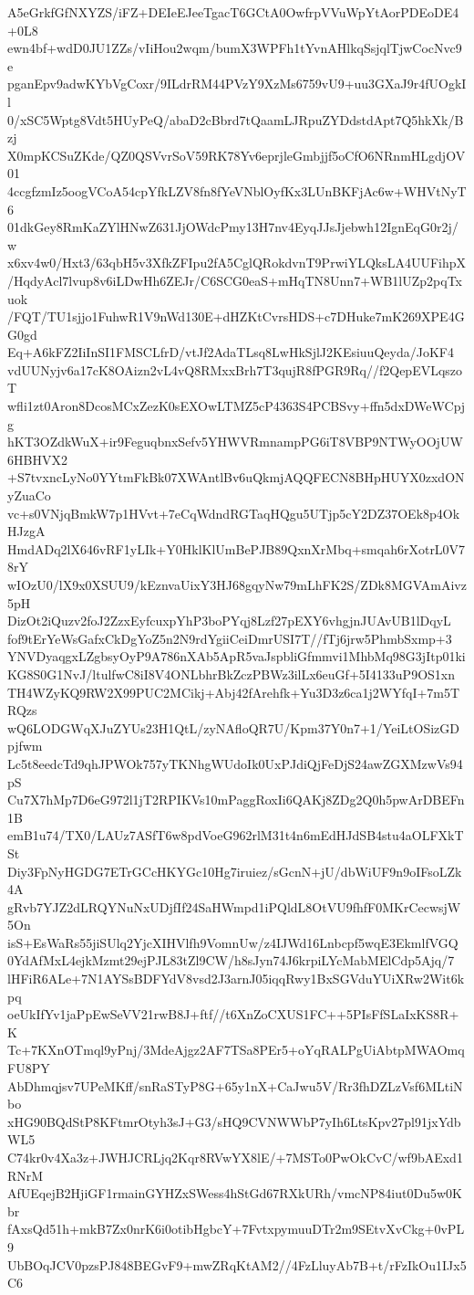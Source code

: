 A5eGrkfGfNXYZS/iFZ+DEIeEJeeTgacT6GCtA0OwfrpVVuWpYtAorPDEoDE4+0L8
ewn4bf+wdD0JU1ZZs/vIiHou2wqm/bumX3WPFh1tYvnAHlkqSsjqlTjwCocNvc9e
pganEpv9adwKYbVgCoxr/9ILdrRM44PVzY9XzMs6759vU9+uu3GXaJ9r4fUOgkIl
0/xSC5Wptg8Vdt5HUyPeQ/abaD2cBbrd7tQaamLJRpuZYDdstdApt7Q5hkXk/Bzj
X0mpKCSuZKde/QZ0QSVvrSoV59RK78Yv6eprjleGmbjjf5oCfO6NRnmHLgdjOV01
4ccgfzmIz5oogVCoA54cpYfkLZV8fn8fYeVNblOyfKx3LUnBKFjAc6w+WHVtNyT6
01dkGey8RmKaZYlHNwZ631JjOWdcPmy13H7nv4EyqJJsJjebwh12IgnEqG0r2j/w
x6xv4w0/Hxt3/63qbH5v3XfkZFIpu2fA5CglQRokdvnT9PrwiYLQksLA4UUFihpX
/HqdyAcl7lvup8v6iLDwHh6ZEJr/C6SCG0eaS+mHqTN8Unn7+WB1lUZp2pqTxuok
/FQT/TU1sjjo1FuhwR1V9nWd130E+dHZKtCvrsHDS+c7DHuke7mK269XPE4GG0gd
Eq+A6kFZ2IiInSI1FMSCLfrD/vtJf2AdaTLsq8LwHkSjlJ2KEsiuuQeyda/JoKF4
vdUUNyjv6a17cK8OAizn2vL4vQ8RMxxBrh7T3qujR8fPGR9Rq//f2QepEVLqszoT
wfli1zt0Aron8DcosMCxZezK0sEXOwLTMZ5cP4363S4PCBSvy+ffn5dxDWeWCpjg
hKT3OZdkWuX+ir9FeguqbnxSefv5YHWVRmnampPG6iT8VBP9NTWyOOjUW6HBHVX2
+S7tvxncLyNo0YYtmFkBk07XWAntlBv6uQkmjAQQFECN8BHpHUYX0zxdONyZuaCo
vc+s0VNjqBmkW7p1HVvt+7eCqWdndRGTaqHQgu5UTjp5cY2DZ37OEk8p4OkHJzgA
HmdADq2lX646vRF1yLIk+Y0HklKlUmBePJB89QxnXrMbq+smqah6rXotrL0V78rY
wIOzU0/lX9x0XSUU9/kEznvaUixY3HJ68gqyNw79mLhFK2S/ZDk8MGVAmAivz5pH
DizOt2iQuzv2foJ2ZzxEyfcuxpYhP3boPYqj8Lzf27pEXY6vhgjnJUAvUB1lDqyL
fof9tErYeWsGafxCkDgYoZ5n2N9rdYgiiCeiDmrUSI7T//fTj6jrw5PhmbSxmp+3
YNVDyaqgxLZgbsyOyP9A786nXAb5ApR5vaJspbliGfmmvi1MhbMq98G3jItp01ki
KG8S0G1NvJ/ltulfwC8iI8V4ONLbhrBkZczPBWz3ilLx6euGf+5I4133uP9OS1xn
TH4WZyKQ9RW2X99PUC2MCikj+Abj42fArehfk+Yu3D3z6ca1j2WYfqI+7m5TRQzs
wQ6LODGWqXJuZYUs23H1QtL/zyNAfloQR7U/Kpm37Y0n7+1/YeiLtOSizGDpjfwm
Lc5t8eedcTd9qhJPWOk757yTKNhgWUdoIk0UxPJdiQjFeDjS24awZGXMzwVs94pS
Cu7X7hMp7D6eG972l1jT2RPIKVs10mPaggRoxIi6QAKj8ZDg2Q0h5pwArDBEFn1B
emB1u74/TX0/LAUz7ASfT6w8pdVoeG962rlM31t4n6mEdHJdSB4stu4aOLFXkTSt
Diy3FpNyHGDG7ETrGCcHKYGc10Hg7iruiez/sGcnN+jU/dbWiUF9n9oIFsoLZk4A
gRvb7YJZ2dLRQYNuNxUDjfIf24SaHWmpd1iPQldL8OtVU9fhfF0MKrCecwsjW5On
isS+EsWaRs55jiSUlq2YjcXIHVlfh9VomnUw/z4IJWd16Lnbcpf5wqE3EkmlfVGQ
0YdAfMxL4ejkMzmt29ejPJL83tZl9CW/h8sJyn74J6krpiLYcMabMElCdp5Ajq/7
lHFiR6ALe+7N1AYSsBDFYdV8vsd2J3arnJ05iqqRwy1BxSGVduYUiXRw2Wit6kpq
oeUkIfYv1jaPpEwSeVV21rwB8J+ftf//t6XnZoCXUS1FC++5PIsFfSLaIxKS8R+K
Tc+7KXnOTmql9yPnj/3MdeAjgz2AF7TSa8PEr5+oYqRALPgUiAbtpMWAOmqFU8PY
AbDhmqjsv7UPeMKff/snRaSTyP8G+65y1nX+CaJwu5V/Rr3fhDZLzVsf6MLtiNbo
xHG90BQdStP8KFtmrOtyh3sJ+G3/sHQ9CVNWWbP7yIh6LtsKpv27pl91jxYdbWL5
C74kr0v4Xa3z+JWHJCRLjq2Kqr8RVwYX8lE/+7MSTo0PwOkCvC/wf9bAExd1RNrM
AfUEqejB2HjiGF1rmainGYHZxSWess4hStGd67RXkURh/vmcNP84iut0Du5w0Kbr
fAxsQd51h+mkB7Zx0nrK6i0otibHgbcY+7FvtxpymuuDTr2m9SEtvXvCkg+0vPL9
UbBOqJCV0pzsPJ848BEGvF9+mwZRqKtAM2//4FzLluyAb7B+t/rFzIkOu1IJx5C6
